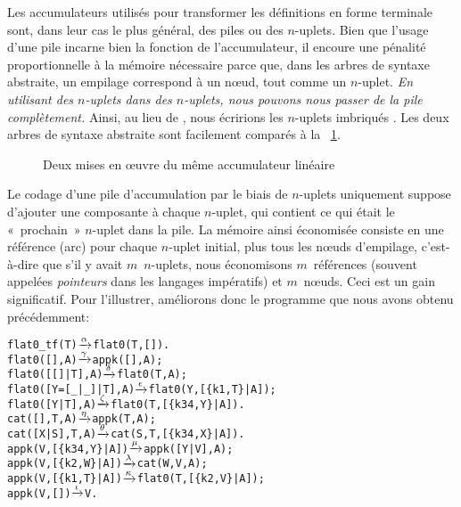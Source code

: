 Les accumulateurs utilisés pour transformer les définitions en forme
terminale sont, dans leur cas le plus général, des piles ou des
\(n\)-uplets. Bien que l'usage d'une pile incarne bien la fonction de
l'accumulateur, il encoure une pénalité proportionnelle à la mémoire
nécessaire parce que, dans les arbres de syntaxe abstraite, un
empilage correspond à un nœud, tout comme un \(n\)-uplet. \emph{En
  utilisant des \(n\)-uplets dans des \(n\)-uplets, nous pouvons nous
  passer de la pile complètement.} Ainsi, au lieu de
\erlcode{[\{k3,\(X_1\)\},\{k1,\(V\),\(E\)\},\{k3,\(X_2\)\}]}, nous
écririons les \(n\)-uplets imbriqués
. Les
deux arbres de syntaxe abstraite sont facilement comparés à la
\fig~\ref{fig:tuple_vs_stack}.
\begin{figure}
\centering
{}
\caption{Deux mises en œuvre du même accumulateur linéaire}
\label{fig:tuple_vs_stack}
\end{figure}
Le codage d'une pile d'accumulation par le biais de \(n\)-uplets
uniquement suppose d'ajouter une composante à chaque \(n\)-uplet, qui
contient ce qui était le «~prochain~» \(n\)-uplet dans la pile. La
mémoire ainsi économisée consiste en une référence (arc) pour chaque
\(n\)-uplet initial, plus tous les nœuds d'empilage, c'est-à-dire
que s'il y avait \(m\)~\(n\)-uplets, nous économisons \(m\)~références
(souvent appelées \emph{pointeurs} dans les langages impératifs) et
\(m\)~nœuds. Ceci est un gain significatif. Pour l'illustrer,
améliorons donc le programme que nous avons obtenu précédemment:
\begin{alltt}
flat0\_tf(T)          \(\smashedrightarrow{\alpha}\) flat0(T,[]).
flat0(         [],A) \(\smashedrightarrow{\gamma}\) appk([],A);
flat0(     [[]|T],A) \(\smashedrightarrow{\delta}\) flat0(T,A);
flat0([Y=[\_|\_]|T],A) \(\smashedrightarrow{\epsilon}\) flat0(Y,[\{k1,T\}|A]);
flat0(    [Y|T],A)   \(\smashedrightarrow{\zeta}\) flat0(T,[\{k34,Y\}|A]).
cat(   [],T,A)       \(\smashedrightarrow{\eta}\) appk(T,A);
cat([X|S],T,A)       \(\smashedrightarrow{\theta}\) cat(S,T,[\{k34,X\}|A]).
appk(V,[\{k34,Y\}|A])  \(\smashedrightarrow{\mu}\) appk([Y|V],A);
appk(V, [\{k2,W\}|A])  \(\smashedrightarrow{\lambda}\) cat(W,V,A);
appk(V, [\{k1,T\}|A])  \(\smashedrightarrow{\kappa}\) flat0(T,[\{k2,V\}|A]);
appk(V,         [])  \(\smashedrightarrow{\iota}\) V.
\end{alltt}
